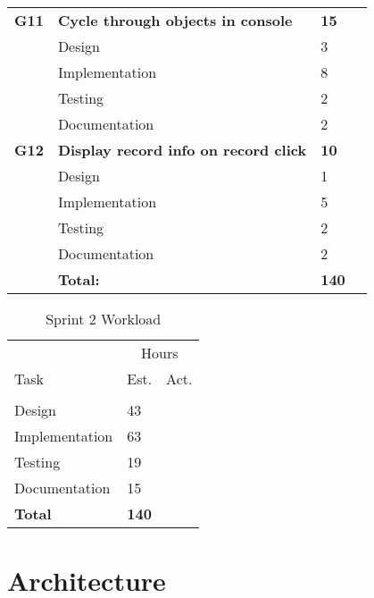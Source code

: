 \begin{table}
\begin{tabular}{ l p{8cm} l l }
 \bf{G11}      &\bf{Cycle through objects in console}              &\bf{15}        &             \\
          &Design                           &3          &      \\
          &Implementation                   &8          &     \\
          &Testing                          &2          &      \\
          &Documentation                    &2          &      \\

\bf{G12}   &\bf{Display record info on record click}               &\bf{10}        &          \\
          &Design                           &1          &      \\
          &Implementation                   &5          &      \\
          &Testing                          &2          &      \\
          &Documentation                    &2          &      \\

\hline 
          &\bf{Total:}                      &\bf{140}       &       \\
\hline
\end{tabular}
\label{table:sp2usrstories}
\end{table}

\begin{table}
\caption{Sprint 2 Workload}
\centering
\begin{tabular}{ l l l }
\hline 
            &\multicolumn{2}{c}{Hours}          \\
 Task       &Est.           &Act.                                  \\ 
\hline \\ [-2.0ex]
Design          &43     &     \\
Implementation  &63     &     \\
Testing         &19     &     \\
Documentation   &15     &     \\
\hline
\bf{Total}          &\bf{140}   &       \\
\hline
\end{tabular}
\label{table:sp2workload}
\end{table}

\section{Architecture}

